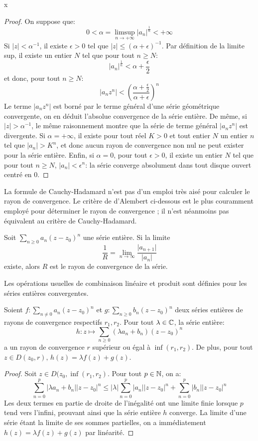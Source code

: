 x
\begin{proof}
On suppose que: 
\[
0 < \alpha = \limsup_{n \to +\infty} |a_n|^{\frac{1}{n}} <
+\infty
\]
Si $|z|<\alpha^{-1}$, il existe $\epsilon > 0$ tel que $|z|\leq
(\alpha+\epsilon)^{-1}$. Par définition de la limite sup, il existe un entier
$N$ tel que pour tout $n \geq N$:
\[
|a_n|^{\frac{1}{n}} < \alpha + \frac{\epsilon}{2}
\]
et donc, pour tout $n \geq N$:
\[
\left|a_nz^n\right|< \left(\frac{\alpha + \frac{\epsilon}{2}}{\alpha +
\epsilon}\right)^n
\]
Le terme $|a_nz^n|$ est borné par le terme général d'une série géométrique
convergente, on  en déduit l'absolue convergence de la série entière.
De même, si $|z|> \alpha^{-1}$, le même raisonnement montre que la série de terme général
$\left|a_nz^n\right|$ est divergente. Si $\alpha = +\infty$, il existe pour tout
réel $K>0$ et tout entier $N$ un entier $n$ tel que $|a_n|>K^n$, et donc aucun
rayon de convergence non nul ne peut exister pour la série entière. Enfin, si
$\alpha = 0$, pour tout $\epsilon > 0$, il existe un entier $N$ tel que pour
tout $n \geq N$, $|a_n|<\epsilon^n$: la série converge absolument dans tout
disque ouvert centré en 0.
\end{proof}
La formule de Cauchy-Hadamard n'est pas d'un emploi très aisé pour calculer le rayon de convergence. Le critère de d'Alembert ci-dessous est le plus couramment employé pour déterminer le rayon de
convergence ; il n'est néanmoins pas équivalent au critère de Cauchy-Hadamard.
\begin{fprop}
Soit $\sum_{n \geq 0}a_n (z-z_0)^n$ une série entière. Si la limite
\[\frac{1}{R} = \lim_{n \to \infty}\frac{\lvert a_{n+1}\rvert}{ \lvert a_{n} \rvert}
\]
existe, alors $R$ est le rayon de convergence de la série.
\end{fprop} 
Les opérations usuelles de combinaison linéaire et produit sont définies pour les séries entières convergentes.
\begin{fprop}
Soient $f \colon \sum_{n \neq 0}a_n(z-z_0)^n$ et $g \colon \sum_{n \geq 0} b_n (z-z_0)^n$ deux séries entières de rayons de convergence respectifs $r_1,r_2$. Pour tout $\lambda \in \mathbb{C}$, la série entière:
\[
h \colon z \mapsto \sum_{n \geq 0} (\lambda a_n + b_n) (z-z_0)^n
\]
a un rayon de convergence $r$ supérieur ou égal à $\inf(r_1,r_2)$. De plus, pour tout $z \in D(z_0,r), \, h(z) = \lambda f(z) + g(z)$.
\end{fprop}
\begin{proof}
Soit $z \in D(z_0, \inf(r_1,r_2)$. Pour tout $p \in {\mathbb N}$, on a:
\[
\sum_{n=0}^p \lvert \lambda a_n + b_n \lvert |z-z_0|^n \leq  \lvert \lambda\rvert  \sum_{n=0}^p \lvert a_n \lvert |z-z_0|^n + \sum_{n=0}^p \lvert b_n \lvert |z-z_0|^n 
\]
Les deux termes en partie de droite de l'inégalité ont une limite finie lorsque $p$ tend vers l'infini, prouvant ainsi que la série entière $h$ converge. La limite d'une série étant la limite de ses sommes partielles, on a immédiatement $h(z) = \lambda f(z) + g(z)$ par linéarité.
\end{proof}
